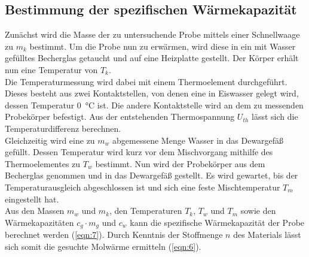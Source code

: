 \subsection{Bestimmung der spezifischen Wärmekapazität}
Zunächst wird die Masse der zu untersuchende Probe mittels einer Schnellwaage zu $m_k$ bestimmt.
Um die Probe nun zu erwärmen, wird diese in ein mit Wasser gefülltes Becherglas getaucht und auf eine Heizplatte gestellt.
Der Körper erhält nun eine Temperatur von $T_k$. \\
Die Temperaturmessung wird dabei mit einem Thermoelement durchgeführt.
Dieses besteht aus zwei Kontaktstellen, von denen eine in Eiswasser gelegt wird, dessen Temperatur \SI{0}{\celsius} ist.
Die andere Kontaktstelle wird an dem zu messenden Probekörper befestigt.
Aus der entstehenden Thermospannung $U_{th}$ lässt sich die Temperaturdifferenz berechnen. \\
Gleichzeitig wird eine zu $m_w$ abgemessene Menge Wasser in das Dewargefäß gefüllt.
Dessen Temperatur wird kurz vor dem Mischvorgang mithilfe des Thermoelementes zu $T_w$ bestimmt.
Nun wird der Probekörper aus dem Becherglas genommen und in das Dewargefäß gestellt.
Es wird gewartet, bis der Temperaturausgleich abgeschlossen ist und sich eine feste Mischtemperatur $T_m$ eingestellt hat. \\
Aus den Massen $m_w$ und $m_k$, den Temperaturen $T_k$, $T_w$ und $T_m$ sowie den Wärmekapazitäten $c_g \cdot m_g$ und $c_w$ kann die spezifische Wärmekapazität der Probe berechnet werden (\ref{eqn:7}).
Durch Kenntnis der Stoffmenge $n$ des Materials lässt sich somit die gesuchte Molwärme ermitteln (\ref{eqn:6}).  \\
